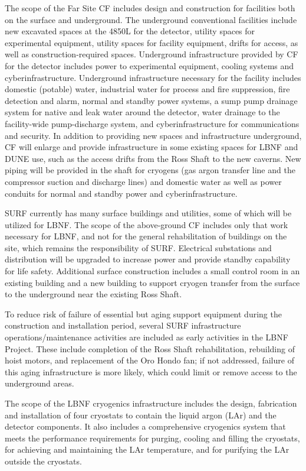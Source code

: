  
The scope of the Far Site CF includes design and construction for facilities both on the surface and underground. The underground conventional facilities include new excavated spaces at the 4850L for the detector, utility spaces for experimental equipment, utility spaces for facility equipment, drifts for access, as well as construction-required spaces. Underground infrastructure provided by CF for the detector includes power to experimental equipment, cooling systems and cyberinfrastructure. Underground infrastructure necessary for the facility includes domestic (potable) water, industrial water for process and fire suppression, 
fire detection and alarm, normal and standby power systems, a sump pump drainage system for native and leak water around the detector, water drainage to the facility-wide pump-discharge system, and cyberinfrastructure for communications and security.
In addition to providing new spaces and infrastructure underground, CF will enlarge and provide infrastructure in some existing spaces for LBNF and DUNE use, such as the access drifts from the Ross Shaft to the new caverns. New piping will be provided in the shaft for cryogens (gas argon transfer line and the compressor suction and discharge lines) and domestic water as well as power conduits for normal and standby power and cyberinfrastructure. 
 
SURF currently has many surface buildings and utilities, some of which will be utilized for LBNF. The scope of the above-ground CF includes only that work necessary for LBNF, and not for the general rehabilitation of buildings on the site, which remains the responsibility of SURF. 
Electrical substations and distribution will be upgraded to increase power and provide standby capability for life safety. Additional surface construction %
includes a small control room in an existing building and a new building to support cryogen transfer from the surface to the underground near the existing Ross Shaft.
 
To reduce risk of failure of essential but aging support equipment during the construction and installation period, several SURF infrastructure operations/maintenance activities are included as early activities in  the LBNF Project. These include completion of the Ross Shaft rehabilitation, rebuilding of hoist motors, and replacement of the Oro Hondo fan; if not addressed, 
failure of this aging infrastructure is more likely, which could limit or remove access to the underground areas.
 
The scope of the LBNF cryogenics infrastructure includes the design, fabrication and installation of four cryostats to contain the liquid argon (LAr) and the detector components. It also includes a comprehensive cryogenics system that meets the performance requirements for purging, cooling and filling the cryostats, for achieving and maintaining the LAr temperature, and for purifying the LAr outside the cryostats. 
 

